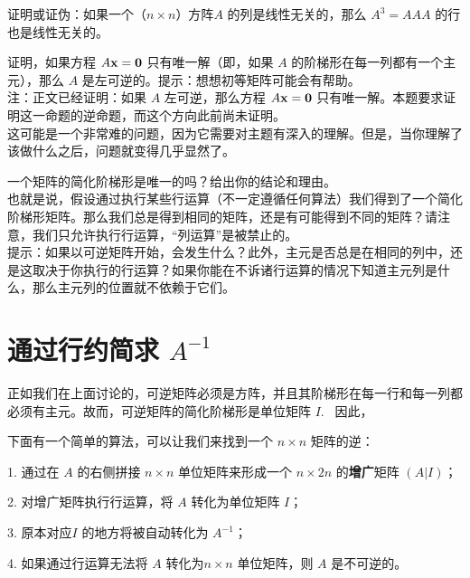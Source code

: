 \begin{problemset}
\item \label{ex:02-03-07} 证明或证伪：如果一个（$n \times n$）方阵$A$ 的列是线性无关的，那么 $A^3 = AAA$ 的行也是线性无关的。
\item \label{ex:02-03-08} 证明，如果方程 $A \mathbf{x} = \mathbf{0}$ 只有唯一解（即，如果 $A$ 的阶梯形在每一列都有一个主元），那么 $A$ 是左可逆的。{\heiti 提示}：想想初等矩阵可能会有帮助。
\\
{\heiti 注：}正文已经证明：如果 $A$ 左可逆，那么方程 $A\mathbf{x}=\mathbf{0}$ 只有唯一解。本题要求证明这一命题的逆命题，而这个方向此前尚未证明。
\\
这可能是一个非常难的问题，因为它需要对主题有深入的理解。但是，当你理解了该做什么之后，问题就变得几乎显然了。
\item \label{ex:02-03-09} 一个矩阵的简化阶梯形是唯一的吗？给出你的结论和理由。
\\
也就是说，假设通过执行某些行运算（不一定遵循任何算法）我们得到了一个简化阶梯形矩阵。那么我们总是得到相同的矩阵，还是有可能得到不同的矩阵？请注意，我们只允许执行行运算，“列运算”是被禁止的。
\\
{\heiti 提示}：如果以可逆矩阵开始，会发生什么？此外，主元是否总是在相同的列中，还是这取决于你执行的行运算？如果你能在不诉诸行运算的情况下知道主元列是什么，那么主元列的位置就不依赖于它们。
\end{problemset}


\section{\texorpdfstring{通过行约简求 $A^{-1}$}{通过行约简求 A 的逆矩阵}}\label{sec:02-04}

正如我们在上面讨论的，可逆矩阵必须是方阵，并且其阶梯形在每一行和每一列都必须有主元。故而，可逆矩阵的简化阶梯形是单位矩阵 $I$. ~因此，


下面有一个简单的算法，可以让我们来找到一个 $n \times n$ 矩阵的逆：

1. 通过在 $A$ 的右侧拼接 $n \times n$ 单位矩阵来形成一个 $n \times 2n$ 的\textbf{增广}矩阵 $(A | I)$；

2. 对增广矩阵执行行运算，将 $A$ 转化为单位矩阵 $I$；

3. 原本对应$I$ 的地方将被自动转化为 $A^{-1}$；

4. 如果通过行运算无法将 $A$ 转化为$n \times n$ 单位矩阵，则 $A$ 是不可逆的。

